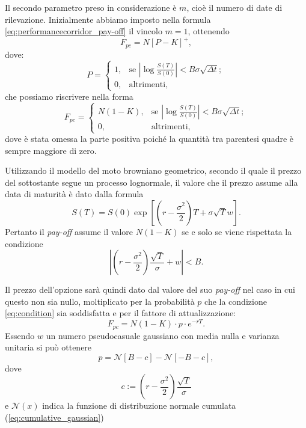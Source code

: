 Il secondo parametro preso in considerazione è $m$, cioè il numero di date di rilevazione. Inizialmente abbiamo imposto nella formula \eqref{eq:performancecorridor_pay-off} il vincolo $m=1$, ottenendo
\begin{equation}
    F_{pc}=N[P-K]^{+},
\end{equation}
dove:
\begin{equation}
    P = \begin{cases}
    1, & \text{se} \,\,\left| \log{\frac{S(T)}{S(0)}} \right| < B \sigma \sqrt{\Delta t};\\
    0, & \text{altrimenti},
    \label{eq:pc_condition}
  \end{cases}
\end{equation}
che possiamo riscrivere nella forma
\begin{equation}
    F_{pc} = \begin{cases}
    N(1-K), & \text{se} \,\,\left| \log{\frac{S(T)}{S(0)}} \right| < B\sigma \sqrt{\Delta t};\\
    0, & \text{altrimenti},
  \end{cases}
\end{equation}
dove è stata omessa la parte positiva poiché la quantità tra parentesi quadre è sempre maggiore di zero.

Utilizzando il modello del moto browniano geometrico, secondo il quale il prezzo del sottostante segue un processo lognormale, il valore che il prezzo assume alla data di maturità è dato dalla formula
\begin{equation}
    S(T) = S(0) \exp{\left[\left(r- \frac{\sigma^2}{2}\right)T + \sigma \sqrt{T} w\right]}.
\end{equation}
Pertanto il \textit{pay-off} assume il valore $N(1-K)$ se e solo se viene rispettata la condizione
\begin{equation}
    \left| \left(r- \frac{\sigma^2}{2}\right) \frac{\sqrt{T}}{\sigma} + w \right| < B.
    \label{eq:condition}
\end{equation}

Il prezzo dell'opzione sarà quindi dato dal valore del suo \textit{pay-off} nel caso in cui questo non sia nullo, moltiplicato per la probabilità $p$ che la condizione \eqref{eq:condition} sia soddisfatta e per il fattore di attualizzazione:
\begin{equation}
    F_{pc}=N(1-K) \cdot p \cdot e^{-rT}.
\end{equation}
Essendo $w$ un numero pseudocasuale gaussiano con media nulla e varianza unitaria si può ottenere
\begin{equation}
    p = \mathcal{N}[B-c] - \mathcal{N}[-B-c],
\end{equation}
dove
\begin{equation}
    c:=\left(r- \frac{\sigma^2}{2}\right) \frac{\sqrt{T}}{\sigma}
\end{equation}
e $\mathcal{N}(x)$ indica la funzione di distribuzione normale cumulata (\ref{eq:cumulative_gaussian})

